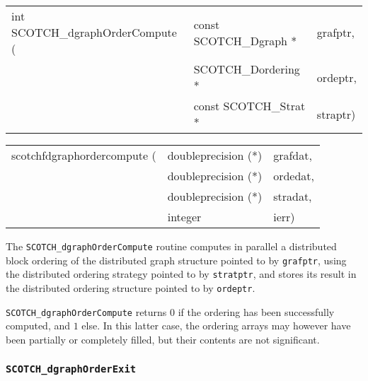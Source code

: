 \begin{itemize}
\progsyn

{\tt\begin{tabular}{l@{}ll}
int SCOTCH\_dgraphOrderCompute ( & const SCOTCH\_Dgraph * & grafptr, \\
                                 & SCOTCH\_Dordering *    & ordeptr, \\
                                 & const SCOTCH\_Strat *  & straptr)
\end{tabular}}

{\tt\begin{tabular}{l@{}ll}
scotchfdgraphordercompute ( & doubleprecision (*) & grafdat, \\
                            & doubleprecision (*) & ordedat, \\
                            & doubleprecision (*) & stradat, \\
                            & integer             & ierr)
\end{tabular}}

\progdes

The {\tt SCOTCH\_dgraphOrderCompute} routine computes in parallel a
distributed block ordering of the distributed graph structure pointed
to by {\tt grafptr}, using the distributed ordering strategy pointed to
by {\tt stratptr}, and stores its result in the distributed ordering
structure pointed to by {\tt ordeptr}.

\progret

{\tt SCOTCH\_dgraphOrderCompute} returns $0$ if the ordering has been
successfully computed, and $1$ else. In this latter case, the ordering
arrays may however have been partially or completely filled, but their
contents are not significant.
\end{itemize}

\subsubsection{{\tt SCOTCH\_dgraphOrderExit}}

